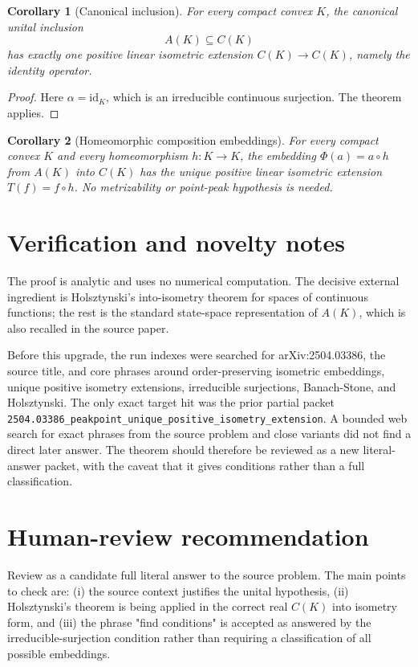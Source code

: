 \documentclass[11pt]{amsart}
\newtheorem{corollary}{Corollary}
\theoremstyle{definition}
\begin{document}
\begin{corollary}[Canonical inclusion]
For every compact convex \(K\), the canonical unital inclusion
\[
  A(K)\subseteq C(K)
\]
has exactly one positive linear isometric extension \(C(K)\to C(K)\), namely
the identity operator.
\end{corollary}

\begin{proof}
Here \(\alpha=\mathrm{id}_K\), which is an irreducible continuous surjection.
The theorem applies.
\end{proof}

\begin{corollary}[Homeomorphic composition embeddings]
For every compact convex \(K\) and every homeomorphism \(h:K\to K\), the
embedding \(\Phi(a)=a\circ h\) from \(A(K)\) into \(C(K)\) has the unique
positive linear isometric extension \(T(f)=f\circ h\).  No metrizability or
point-peak hypothesis is needed.
\end{corollary}

\section*{Verification and novelty notes}
The proof is analytic and uses no numerical computation.  The decisive
external ingredient is Holsztynski's into-isometry theorem for spaces of
continuous functions; the rest is the standard state-space representation of
\(A(K)\), which is also recalled in the source paper.

Before this upgrade, the run indexes were searched for arXiv:2504.03386, the
source title, and core phrases around order-preserving isometric embeddings,
unique positive isometry extensions, irreducible surjections, Banach-Stone, and
Holsztynski.  The only exact target hit was the prior partial packet
\texttt{2504.03386\_peakpoint\_unique\_positive\_isometry\_extension}.  A
bounded web search for exact phrases from the source problem and close variants
did not find a direct later answer.  The theorem should therefore be reviewed
as a new literal-answer packet, with the caveat that it gives conditions rather
than a full classification.

\section*{Human-review recommendation}
Review as a candidate full literal answer to the source problem.  The main
points to check are: (i) the source context justifies the unital hypothesis,
(ii) Holsztynski's theorem is being applied in the correct real \(C(K)\) into
isometry form, and (iii) the phrase "find conditions" is accepted as answered
by the irreducible-surjection condition rather than requiring a classification
of all possible embeddings.
\end{document}
